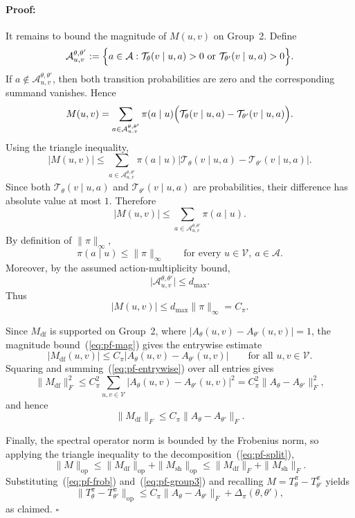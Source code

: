 \documentclass[twoside]{article}
\renewenvironment{proof}{\paragraph{Proof:}}{\hfill$\square$}
\begin{document}
\begin{proof}
It remains to bound the magnitude of $M(u,v)$ on Group~2. Define
\[
    \mathcal A_{u,v}^{\theta,\theta'}
    :=
    \Bigl\{
        a\in\mathcal A:
        \mathcal T_\theta(v\mid u,a)>0
        \text{ or }
        \mathcal T_{\theta'}(v\mid u,a)>0
    \Bigr\}.
\]
If $a\notin\mathcal A_{u,v}^{\theta,\theta'}$, then both transition
probabilities are zero and the corresponding summand vanishes. Hence
\[
    M(u,v)
    =
    \sum_{a\in\mathcal A_{u,v}^{\theta,\theta'}}
    \pi(a\mid u)
    \Bigl(
        \mathcal T_\theta(v\mid u,a)
        -
        \mathcal T_{\theta'}(v\mid u,a)
    \Bigr).
\]
Using the triangle inequality,
\[
    |M(u,v)|
    \le
    \sum_{a\in\mathcal A_{u,v}^{\theta,\theta'}}
    \pi(a\mid u)
    \left|
        \mathcal T_\theta(v\mid u,a)
        -
        \mathcal T_{\theta'}(v\mid u,a)
    \right|.
\]
Since both $\mathcal T_\theta(v\mid u,a)$ and
$\mathcal T_{\theta'}(v\mid u,a)$ are probabilities, their difference
has absolute value at most $1$. Therefore
\[
    |M(u,v)|
    \le
    \sum_{a\in\mathcal A_{u,v}^{\theta,\theta'}}
    \pi(a\mid u).
\]
By definition of $\|\pi\|_\infty$,
\[
    \pi(a\mid u)\le \|\pi\|_\infty
    \qquad
    \text{for every } u\in\mathcal V,\ a\in\mathcal A.
\]
Moreover, by the assumed action-multiplicity bound,
\[
    \bigl|\mathcal A_{u,v}^{\theta,\theta'}\bigr|
    \le d_{\max}.
\]
Thus
\begin{equation}\label{eq:pf-mag}
    |M(u,v)|
    \le
    d_{\max}\|\pi\|_\infty
    =
    C_\pi.
\end{equation}

Since $M_{\mathrm{df}}$ is supported on Group~2, where
$\bigl|A_\theta(u,v)-A_{\theta'}(u,v)\bigr|=1$, the magnitude
bound~(\ref{eq:pf-mag}) gives the entrywise estimate
\begin{equation}\label{eq:pf-entrywise}
    |M_{\mathrm{df}}(u,v)|
    \le
    C_\pi
    \bigl|A_\theta(u,v)-A_{\theta'}(u,v)\bigr|
    \qquad
    \text{for all } u,v\in\mathcal V.
\end{equation}
Squaring and summing~(\ref{eq:pf-entrywise}) over all entries gives
\[
    \|M_{\mathrm{df}}\|_F^2
    \le
    C_\pi^2
    \sum_{u,v\in\mathcal V}
    \bigl|A_\theta(u,v)-A_{\theta'}(u,v)\bigr|^2
    =
    C_\pi^2
    \|A_\theta-A_{\theta'}\|_F^2,
\]
and hence
\begin{equation}\label{eq:pf-frob}
    \|M_{\mathrm{df}}\|_F
    \le
    C_\pi
    \|A_\theta-A_{\theta'}\|_F.
\end{equation}

Finally, the spectral operator norm is bounded by the Frobenius norm, so
applying the triangle inequality to the
decomposition~(\ref{eq:pf-split}),
\[
    \|M\|_{\mathrm{op}}
    \le
    \|M_{\mathrm{df}}\|_{\mathrm{op}}
    +
    \|M_{\mathrm{sh}}\|_{\mathrm{op}}
    \le
    \|M_{\mathrm{df}}\|_F
    +
    \|M_{\mathrm{sh}}\|_F .
\]
Substituting~(\ref{eq:pf-frob}) and~(\ref{eq:pf-group3}) and recalling
$M=T^\pi_\theta-T^\pi_{\theta'}$ yields
\[
    \bigl\|T^\pi_\theta-T^\pi_{\theta'}\bigr\|_{\mathrm{op}}
    \le
    C_\pi
    \bigl\|A_\theta-A_{\theta'}\bigr\|_F
    +
    \Delta_\pi(\theta,\theta'),
\]
as claimed.
\end{proof}
\end{document}
